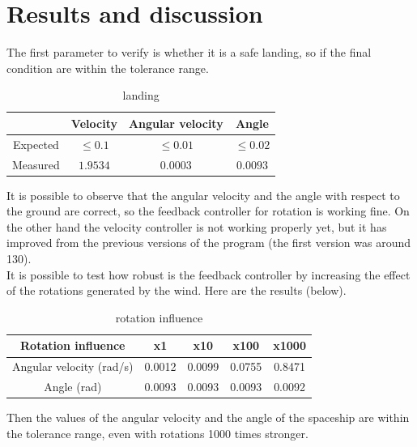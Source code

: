 \documentclass[10pt,a4paper]{article}
\begin{document}
	\section{Results and discussion}
	The first parameter to verify is whether it is a safe landing, so if the final condition are within the tolerance range.
	
	\begin{table}[h]
		\begin{center}
			\begin{tabular}{|c||c|c|c|}
				\hline
				& Velocity & Angular velocity & Angle \\
				\hline \hline
				Expected & $\le 0.1$ & $\le 0.01$ & $\le 0.02$ \\
				\hline
				Measured & $ 1.9534$ & $ 0.0003 $ & $ 0.0093 $ \\
				\hline
			\end{tabular}
			\caption{landing}
		\end{center}
	\end{table}
	
	It is possible to observe that the angular velocity and the angle with respect to the ground are correct, so the feedback controller for rotation is working fine. On the other hand the velocity controller is not working properly yet, but it has improved from the previous versions of the program (the first version was around 130).\\
	
	It is possible to test how robust is the feedback controller by increasing the effect of the rotations generated by the wind. Here are the results (below).
	
	\begin{table}[h]
		\begin{center}
			\begin{tabular}{|c||c|c|c|c|}
				\hline
				Rotation influence & x1 & x10 & x100 & x1000 \\
				\hline \hline
				Angular velocity (rad/s) & 0.0012 & 0.0099 & 0.0755 & 0.8471 \\
				\hline
				Angle (rad) & 0.0093 & 0.0093 & 0.0093 & 0.0092 \\
				\hline
			\end{tabular}
			\caption{rotation influence}
		\end{center}
	\end{table}
	
	Then the values of the angular velocity and the angle of the spaceship are within the tolerance range, even with rotations 1000 times stronger.\\
	
\end{document}
